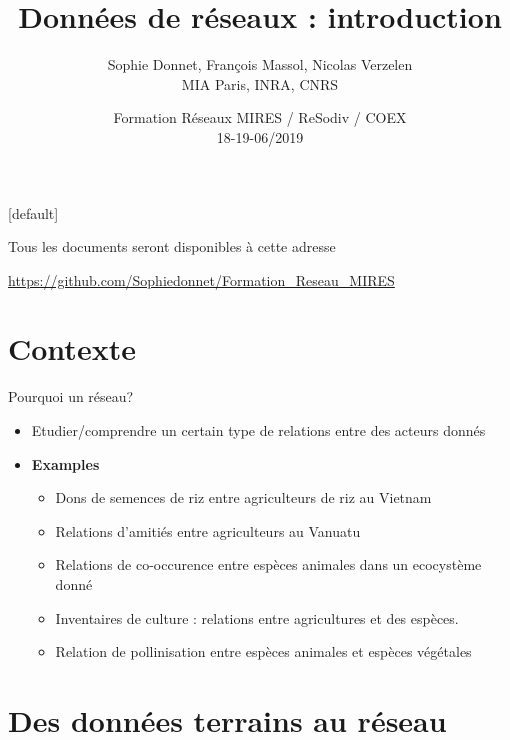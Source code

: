 \documentclass[compress,10pt]{beamer}
\title[Formation Réseaux 06/2019]{ Données de réseaux : introduction }
\author[Donnet, Massol, Verzelen]{ Sophie Donnet, François Massol, Nicolas Verzelen\\ MIA Paris, INRA, CNRS}
\date{Formation Réseaux MIRES / ReSodiv / COEX\\ 18-19-06/2019}
\begin{document}
\begin{frame}
\titlepage
\end{frame}

[default]

\begin{frame}
Tous les documents seront disponibles à cette adresse 

\url{https://github.com/Sophiedonnet/Formation_Reseau_MIRES}

\end{frame}

\section[Contexte]{Contexte}


\begin{frame}{Pourquoi un réseau?}

\begin{itemize}
\item Etudier/comprendre un \textcolor{dgreen}{certain type de  relations} entre des 
\textcolor{dgreen}{acteurs donnés}
\item \textbf{Examples}
\begin{itemize}
\item Dons de semences de riz entre agriculteurs de riz au Vietnam
\item Relations d'amitiés entre agriculteurs au Vanuatu
\item Relations de co-occurence entre espèces animales dans un ecocystème donné
\item Inventaires de culture : relations entre agricultures et des espèces. 
\item Relation de pollinisation entre espèces animales et espèces végétales
\end{itemize}
\end{itemize}
\end{frame}



\section{Des données terrains au réseau}
\end{document}
